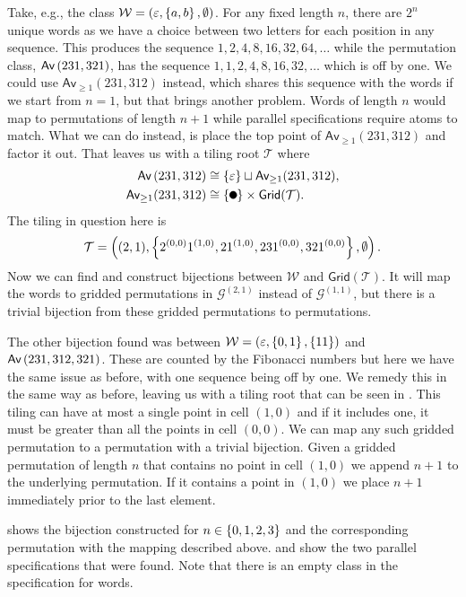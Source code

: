 Take, e.g., the class $\mathcal{W} = (\varepsilon, \left\{a,b\right\}, \emptyset)$. For any fixed length $n$, there are $2^n$ unique words as we have a choice between two letters for each position in any sequence. This produces the sequence $1, 2, 4, 8, 16, 32, 64, \dotsc$ while the permutation class, $\textsf{Av}\left(231,321\right)$, has the sequence $1, 1, 2, 4, 8, 16, 32, \dotsc$ which is off by one. We could use $\textsf{Av}_{\geq1}(231,312)$ instead, which shares this sequence with the words if we start from $n=1$, but that brings another problem. Words of length $n$ would map to permutations of length $n+1$ while parallel specifications require atoms to match. What we can do instead, is place the top point of $\textsf{Av}_{\geq1}(231,312)$ and factor it out. That leaves us with a tiling root $\mathcal{T}$ where
\begin{align*}
    \Av{231,312} &\cong \set{\varepsilon} \sqcup \textsf{Av}_{\geq1}(231,312),\\
    \textsf{Av}_{\geq1}(231,312) &\cong \set{\point{0.1}}\times \textsf{Grid}(\mathcal{T}).
\end{align*}
The tiling in question here is
\[
    \mathcal{T} = \left((2,1), \left\{2^{(0,0)}1^{(1,0)}, 21^{(1,0)}, 231^{(0,0)}, 321^{(0,0)}\right\},\emptyset\right).
\]
Now we can find and construct bijections between $\mathcal{W}$ and $\textsf{Grid}(\mathcal{T})$. It will map the words to gridded permutations in $\mathcal{G}^{(2,1)}$ instead of $\mathcal{G}^{(1,1)}$, but there is a trivial bijection from these gridded permutations to permutations.

The other bijection found was between $\mathcal{W} = (\varepsilon, \left\{0,1\right\}, \left\{11\right\})$ and $\textsf{Av}\left(231,312,321\right)$. These are counted by the Fibonacci numbers but here we have the same issue as before, with one sequence being off by one. We remedy this in the same way as before, leaving us with a tiling root that can be seen in . This tiling can have at most a single point in cell $(1,0)$ and if it includes one, it must be greater than all the points in cell $(0,0)$. We can map any such gridded permutation to a permutation with a trivial bijection. Given a gridded permutation of length $n$ that contains no point in cell $(1,0)$ we append $n+1$ to the underlying permutation. If it contains a point in $(1,0)$ we place $n+1$ immediately prior to the last element.

 shows the bijection constructed for $n \in \left\{0,1,2,3\right\}$ and the corresponding permutation with the mapping described above.  and  show the two parallel specifications that were found. Note that there is an empty class in the specification for words.

